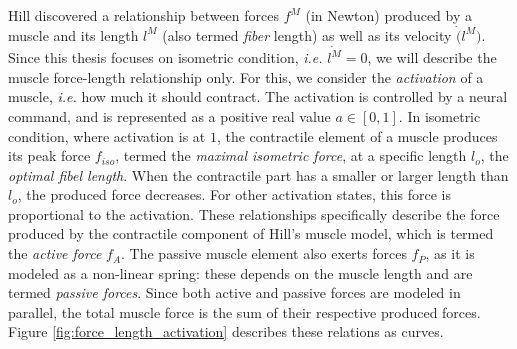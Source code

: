Hill discovered a relationship between forces $f^M$ (in Newton) produced by a muscle and its length $l^M$ (also termed \emph{fiber} length) as well as its velocity $\dot(l^M)$. Since this thesis focuses on isometric condition, \emph{i.e.} $\dot{l^M} = 0$, we will describe the muscle force-length relationship only. For this, we consider the \emph{activation} of a muscle, \emph{i.e.} how much it should contract. The activation is controlled by a neural command, and is represented as a positive real value $a\in [0,1]$. In isometric condition, where activation is at $1$, the contractile element of a muscle produces its peak force $f_{iso}$, termed the \emph{maximal isometric force}, at a specific length $l_o$, the \emph{optimal fibel length}. When the contractile part has a smaller or larger length than $l_o$, the produced force decreases. For other activation states, this force is proportional to the activation. These relationships specifically describe the force produced by the contractile component of Hill's muscle model, which is termed the \emph{active force} $f_A$. The passive muscle element also exerts forces $f_P$, as it is modeled as a non-linear spring: these depends on the muscle length and are termed \emph{passive forces}. Since both active and passive forces are modeled in parallel, the total muscle force is the sum of their respective produced forces.
Figure \ref{fig:force_length_activation} describes these relations as curves.
